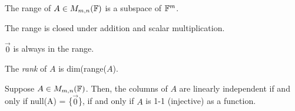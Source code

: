 \begin{remark*}
The range of $A \in M_{m,n}(\mathbb F)$ is a subspace of $\mathbb F^m$.
\end{remark*}
\begin{remark*}
The range is closed under addition and scalar multiplication.
\end{remark*}
\begin{remark*}
$\vec{0}$ is always in the range.
\end{remark*}

\begin{definition}[Rank]
\label{def:rank}
The \textit{rank} of $A$ is dim(range($A$).
\end{definition}

\begin{proposition}
\label{prop:indep-nullspace}
Suppose $A \in M_{m,n}(\mathbb F)$. Then, the columns of $A$ are linearly independent if and only if null(A) = \{$\vec{0}$\}, if and only if $A$ is 1-1 (injective) as a function.
\end{proposition}

